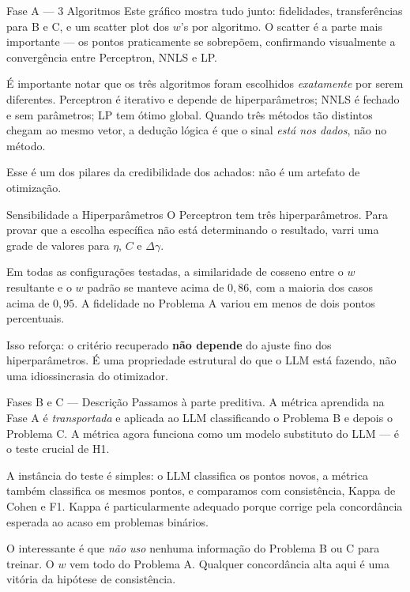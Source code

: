 \documentclass[aspectratio=169,10pt]{beamer}
\begin{document}
\begin{frame}{Fase A --- 3 Algoritmos}
  \small
  Este gr\'afico mostra tudo junto: fidelidades, transfer\^encias para B e C, e um scatter plot dos
  $w$'s por algoritmo. O scatter \'e a parte mais importante --- os pontos praticamente se sobrep\~oem,
  confirmando visualmente a converg\^encia entre Perceptron, NNLS e LP.
  \medskip

  \'E importante notar que os tr\^es algoritmos foram escolhidos \emph{exatamente} por serem diferentes.
  Perceptron \'e iterativo e depende de hiperpar\^ametros; NNLS \'e fechado e sem par\^ametros; LP tem
  \'otimo global. Quando tr\^es m\'etodos t\~ao distintos chegam ao mesmo vetor, a dedu\c{c}\~ao l\'ogica
  \'e que o sinal \emph{est\'a nos dados}, n\~ao no m\'etodo.
  \medskip

  Esse \'e um dos pilares da credibilidade dos achados: n\~ao \'e um artefato de otimiza\c{c}\~ao.
\end{frame}

\begin{frame}{Sensibilidade a Hiperpar\^ametros}
  \small
  O Perceptron tem tr\^es hiperpar\^ametros. Para provar que a escolha espec\'ifica n\~ao est\'a
  determinando o resultado, varri uma grade de valores para $\eta$, $C$ e $\Delta\gamma$.
  \medskip

  Em todas as configura\c{c}\~oes testadas, a similaridade de cosseno entre o $w$ resultante e o $w$
  padr\~ao se manteve acima de $0{,}86$, com a maioria dos casos acima de $0{,}95$. A fidelidade no
  Problema A variou em menos de dois pontos percentuais.
  \medskip

  Isso refor\c{c}a: o crit\'erio recuperado \textbf{n\~ao depende} do ajuste fino dos hiperpar\^ametros.
  \'E uma propriedade estrutural do que o LLM est\'a fazendo, n\~ao uma idiossincrasia do otimizador.
\end{frame}

\begin{frame}{Fases B e C --- Descri\c{c}\~ao}
  \small
  Passamos \`a parte preditiva. A m\'etrica aprendida na Fase A \'e \emph{transportada} e aplicada ao
  LLM classificando o Problema B e depois o Problema C. A m\'etrica agora funciona como um modelo
  substituto do LLM --- \'e o teste crucial de H1.
  \medskip

  A inst\^ancia do teste \'e simples: o LLM classifica os pontos novos, a m\'etrica tamb\'em classifica
  os mesmos pontos, e comparamos com consist\^encia, Kappa de Cohen e F1. Kappa \'e particularmente
  adequado porque corrige pela concord\^ancia esperada ao acaso em problemas bin\'arios.
  \medskip

  O interessante \'e que \emph{n\~ao uso} nenhuma informa\c{c}\~ao do Problema B ou C para treinar.
  O $w$ vem todo do Problema A. Qualquer concord\^ancia alta aqui \'e uma vit\'oria da hip\'otese de
  consist\^encia.
\end{frame}
\end{document}
